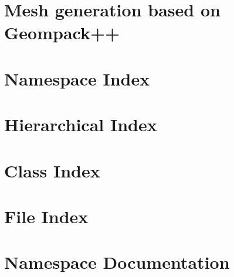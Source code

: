 \let\mypdfximage\pdfximage\def\pdfximage{\immediate\mypdfximage}\documentclass[twoside]{book}
\newcommand{\+}{\discretionary{\mbox{\scriptsize$\hookleftarrow$}}{}{}}
\begin{document}
\raggedbottom

\hypersetup{pageanchor=false,
             bookmarksnumbered=true,
             pdfencoding=unicode
            }
\hypersetup{pageanchor=true}

\chapter{Mesh generation based on Geompack++}
\label{index}\hypertarget{index}{}
\chapter{Namespace Index}

\chapter{Hierarchical Index}

\chapter{Class Index}

\chapter{File Index}

\chapter{Namespace Documentation}



\end{document}
